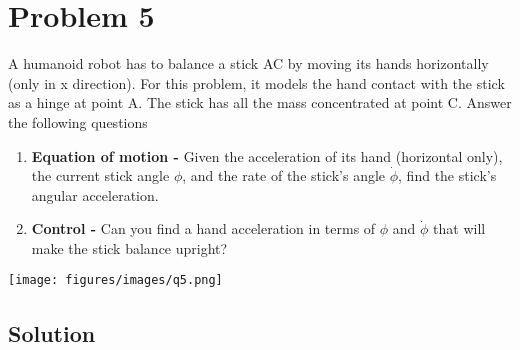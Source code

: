 \section*{Problem 5}

A humanoid robot has to balance a stick AC by moving its hands horizontally (only in x direction).
For this problem, it models the hand contact with the stick as a hinge at point A.
The stick has all the mass concentrated at point C.
Answer the following questions

\begin{enumerate}[label = (\alph*)]
    \item \textbf{Equation of motion -} Given the acceleration of its hand (horizontal only), the current stick angle \( \phi \), and the rate of the stick's angle \( \dot\phi \), find the stick's angular acceleration.
    \item \textbf{Control -} Can you find a hand acceleration in terms of \( \phi \) and \( \dot\phi \) that will make the stick balance upright?
\end{enumerate}

\begin{figure*}[h]
    \centering
    \texttt{[image: figures/images/q5.png]}
\end{figure*}

\subsection*{Solution}

